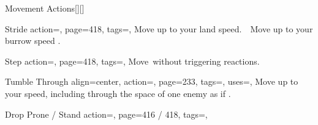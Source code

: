 \begin{PageBackLandscape}
    \begin{TablesHalf}{\backTableHeight}%
        \TableSpace
        \begin{Table}{Movement Actions}[][]
            \begin{entry}{Stride}{%
                action=,
                page=418,
                tags=\Move,
            }
                Move up to your land speed.\hfill
                \;\,\Move\,
                Move up to your burrow speed .
            \end{entry}
            \begin{entry}{Step}{%
                action=,
                page=418,
                tags=\Move,
            }
                Move \,\Feet without triggering reactions.
            \end{entry}
            \begin{entry}{Tumble Through}{%
                align=center,
                action=,
                page=233,
                tags=\Move,
                uses=\AcrobaticsReflex,
            }
                Move up to your speed, including through the space of one enemy as if .\\
                \phant
            \end{entry}
            \breakLine
            \begin{entry}{Drop Prone / Stand}{%
                action=,
                page=416 / 418,
                tags=\Move,
            }

\end{entry}
\end{Table}
\end{TablesHalf}
\end{PageBackLandscape}
